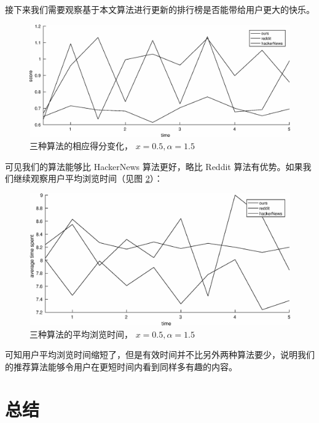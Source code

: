 \documentclass[UTF8]{ctexart}
\theoremstyle{plain}
\theoremstyle{definition}
\theoremstyle{remark}
\begin{document}
	接下来我们需要观察基于本文算法进行更新的排行榜是否能带给用户更大的快乐。
	\begin{figure}[h!]
		\centering
		\includegraphics[width = \linewidth]{../model/douhu/pic/three-method-score.eps}
		\caption{三种算法的相应得分变化， $x=0.5, \alpha=1.5$}\label{fig:three-method-score}
	\end{figure}
	可见我们的算法能够比 HackerNews 算法更好，略比 Reddit 算法有优势。如果我们继续观察用户平均浏览时间（见图 \ref{fig:three-method-average-time}）：
	\begin{figure}[h!]
		\centering
		\includegraphics[width = \linewidth]{../model/douhu/pic/three-method-average-time.eps}
		\caption{三种算法的平均浏览时间， $x=0.5, \alpha=1.5$}\label{fig:three-method-average-time}
	\end{figure}
	可知用户平均浏览时间缩短了，但是有效时间并不比另外两种算法要少，说明我们的推荐算法能够令用户在更短时间内看到同样多有趣的内容。

	\section{总结}
	
	
	\newpage
	\appendix
\end{document}

